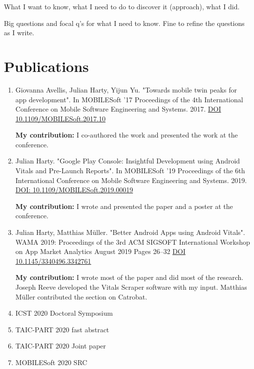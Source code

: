 What I want to know, what I need to do to discover it (approach), what I did.


Big questions and focal q's for what I need to know. Fine to refine the questions as I write.

\clearpage

\section{Publications}
\begin{enumerate}
    \item 	Giovanna Avellis, Julian Harty, Yijun Yu. "Towards mobile twin peaks for app development". In MOBILESoft '17 Proceedings of the 4th International Conference on Mobile Software Engineering and Systems. 2017. \href{https://doi.org/10.1109/MOBILESoft.2017.10}{DOI 10.1109/MOBILESoft.2017.10}~\cite{avellis_harty_yu_towards_mobile_twin_peaks}
    
    \textbf{My contribution:} I co-authored the work and presented the work at the conference.
    \item Julian Harty. "Google Play Console: Insightful Development using Android Vitals and Pre-Launch Reports". In MOBILESoft '19 Proceedings of the 6th International Conference on Mobile Software Engineering and Systems. 2019. \href{https://doi.org/10.1109/MOBILESoft.2019.00019}{DOI: 10.1109/MOBILESoft.2019.00019} ~\cite{harty_google_play_console_insightful_development_using_android_vitals_and_pre_launch_reports}
    
    \textbf{My contribution:} I wrote and presented the paper and a poster at the conference.
    
    \item Julian Harty, Matthias Müller. "Better Android Apps using Android Vitals".  WAMA 2019: Proceedings of the 3rd ACM SIGSOFT International Workshop on App Market Analytics August 2019 Pages 26–32 \href{https://doi.org/10.1145/3340496.3342761}{DOI 10.1145/3340496.3342761}~\cite{harty_better_android_apps_using_android_vitals}
    
    \textbf{My contribution:} I wrote most of the paper and did most of the research. Joseph Reeve developed the Vitals Scraper software with my input. Matthias Müller contributed the section on Catrobat.
    
    \item ICST 2020 Doctoral Symposium
    
    \item TAIC-PART 2020 fast abstract
    
    \item TAIC-PART 2020 Joint paper
    
    \item MOBILESoft 2020 SRC
    
\end{enumerate}

